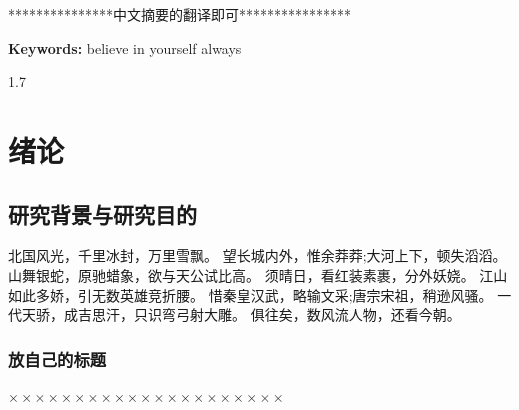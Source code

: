 \documentclass[10pt,a4paper]{article}
\let\heiti\relax %
\begin{document}
    \linespread{1.4}
    ***************中文摘要的翻译即可****************
   

    \bigskip
    \noindent\textbf{ Keywords:} 
    believe in yourself always



    \newpage
    \setcounter{secnumdepth}{4}%
    \setcounter{tocdepth}{2}%

    \renewcommand\contentsname{\zihao{3}\heiti\textbf{目\quad 录}}
  
    \begin{spacing}{1.7}
        {\centering\tableofcontents} %
    \end{spacing}
    \thispagestyle{mulu}
    \vspace*{16pt}
	




    \setcounter{page}{0} %

    \pagestyle{yemei}
    \newpage
    \setcounter{page}{1} %

    \section{绪论}

    \subsection{研究背景与研究目的}
    
        北国风光，千里冰封，万里雪飘。
      望长城内外，惟余莽莽;大河上下，顿失滔滔。
     山舞银蛇，原驰蜡象，欲与天公试比高。
     须晴日，看红装素裹，分外妖娆。
      江山如此多娇，引无数英雄竞折腰。
      惜秦皇汉武，略输文采;唐宗宋祖，稍逊风骚。
     一代天骄，成吉思汗，只识弯弓射大雕。
     俱往矣，数风流人物，还看今朝。
    


    

    \subsubsection{放自己的标题}
    $\times \times \times\times \times \times\times \times \times\times \times \times\times \times \times\times \times \times\times \times \times$
\end{document}
